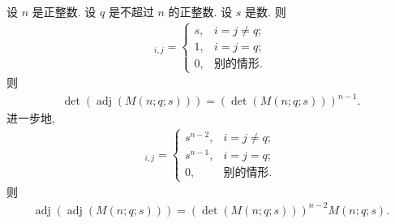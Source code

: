 \documentclass[../libro.tex]{subfiles}
\begin{document}
\begin{theorem}
    设 \(n\) 是正整数.
    设 \(q\) 是不超过 \(n\) 的正整数.
    设 \(s\) 是数.
    则
    \begin{align*}
        [\operatorname{adj} {(M(n; q; s))}]_{i,j} =
        \begin{cases}
            s, & i = j \neq q; \\
            1, & i = j = q;    \\
            0, & \text{别的情形}.
        \end{cases}
    \end{align*}
    则
    \begin{align*}
        \det {(\operatorname{adj} {(M(n; q; s))})}
        = (\det {(M(n; q; s))})^{n-1}.
    \end{align*}
    进一步地,
    \begin{align*}
        [\operatorname{adj} {(
                    \operatorname{adj} {(M(n; q; s))}
        )}]_{i,j} =
        \begin{cases}
            s^{n-2}, & i = j \neq q; \\
            s^{n-1}, & i = j = q;    \\
            0,       & \text{别的情形}.
        \end{cases}
    \end{align*}
    则
    \begin{align*}
        \operatorname{adj} {(\operatorname{adj} {(M(n; q; s))})}
        = (\det {(M(n; q; s))})^{n-2} M(n; q; s).
    \end{align*}
\end{theorem}
\end{document}
